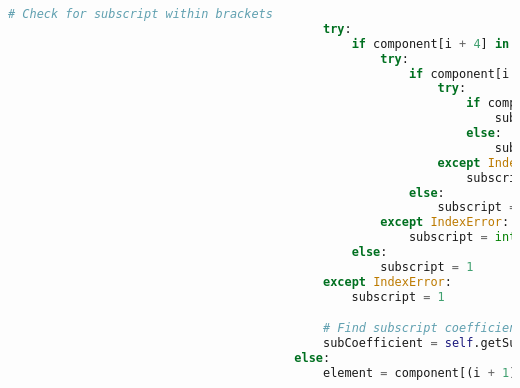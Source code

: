 \documentclass[a4paper,12pt]{article}
\begin{document}
\begin{lstlisting}[language=Python, caption=parseComponent method for finding elements, label={lst:parsecomponent}]
                                            # Check for subscript within brackets
                                            try:
                                                if component[i + 4] in self.integers:
                                                    try:
                                                        if component[i + 5] in self.integers:
                                                            try:
                                                                if component[i + 6] in self.integers:
                                                                    subscript = int(component[(i + 4): (i + 7)])
                                                                else:
                                                                    subscript = int(component[(i + 4): (i + 6)])
                                                            except IndexError:
                                                                subscript = int(component[(i + 4): (i + 6)])
                                                        else:
                                                            subscript = int(component[i + 4])
                                                    except IndexError:
                                                        subscript = int(component[i + 4])
                                                else:
                                                    subscript = 1
                                            except IndexError:
                                                subscript = 1

                                            # Find subscript coefficient of complex ion
                                            subCoefficient = self.getSubCoefficient(component)
                                        else:
                                            element = component[(i + 1): (i + 3)]


\end{lstlisting}
\end{document}
